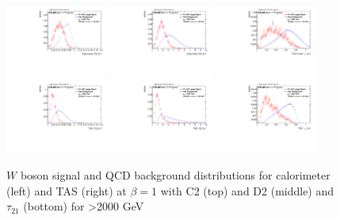 \begin{figure}[htp]
\includegraphics[width=0.3\textwidth]{sascha_input/plots/W/Beta1/h_recoJet_C2_bin6.pdf} 
\includegraphics[width=0.3\textwidth]{sascha_input/plots/W/Beta1/h_recoJet_D2_bin6.pdf} 	
\includegraphics[width=0.3\textwidth]{sascha_input/plots/W/Beta1/h_recoJet_nSub21_bin6.pdf}
\bigskip
\includegraphics[width=0.3\textwidth]{sascha_input/plots/W/Beta1/h_assisted_tj_C2_bin6.pdf} \hspace{6mm}
\includegraphics[width=0.3\textwidth]{sascha_input/plots/W/Beta1/h_assisted_tj_D2_bin6.pdf} \hspace{6mm}
\includegraphics[width=0.3\textwidth]{sascha_input/plots/W/Beta1/h_assisted_tj_nSub21_bin6.pdf}
\caption{\footnotesize{$W$ boson signal and QCD background distributions for calorimeter (left) and TAS (right) at $\beta=1$  with C2 (top) and D2 (middle) and $\tau_{21}$ (bottom) for >2000 GeV}}\label{fig:w_distribution_example}
\end{figure}

